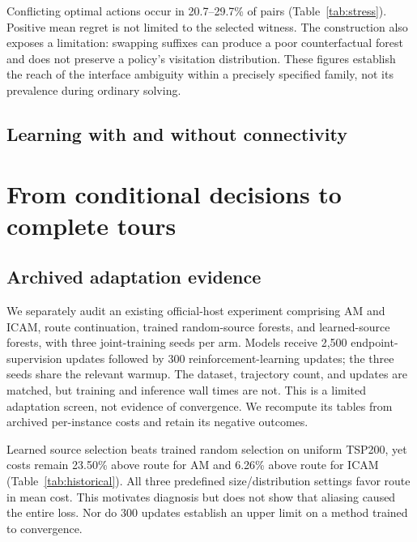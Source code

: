 \documentclass{article}
\begin{document}
Conflicting optimal actions occur in 20.7--29.7\% of pairs
(Table~\ref{tab:stress}). Positive mean regret is not limited to the selected
witness. The construction also exposes a limitation: swapping suffixes can
produce a poor counterfactual forest and does not preserve a policy's visitation
distribution. These figures establish the reach of the interface ambiguity
within a precisely specified family, not its prevalence during ordinary solving.

\subsection{Learning with and without connectivity}
\label{sec:conditional}


\section{From conditional decisions to complete tours}
\label{sec:hosts}

\subsection{Archived adaptation evidence}
We separately audit an existing official-host experiment comprising AM and
ICAM, route continuation, trained random-source forests, and learned-source
forests, with three joint-training seeds per arm. Models receive 2,500
endpoint-supervision updates followed by 300 reinforcement-learning updates;
the three seeds share the relevant warmup. The dataset, trajectory count,
and updates are matched, but training and inference wall times are not.
This is a limited adaptation screen, not evidence of convergence. We recompute
its tables from archived per-instance costs and retain its negative outcomes.

\begin{table}[t]
\centering\small

\caption{Archived adaptation screen, kept separate from new interventions.
U200/C200/U500 denote uniform TSP200, clustered TSP200, and uniform TSP500.
Entries average three joint seeds sharing warmup; lower is better.
Learned excess is relative to adapted route. No inference-time equivalence
or state-repair conclusion follows from this table.}
\label{tab:historical}
\end{table}

Learned source selection beats trained random selection on uniform TSP200,
yet costs remain 23.50\% above route for AM and 6.26\% above route for ICAM
(Table~\ref{tab:historical}). All three predefined size/distribution settings
favor route in mean cost. This motivates diagnosis
but does not show that aliasing caused the entire loss. Nor do 300 updates
establish an upper limit on a method trained to convergence.
\end{document}
